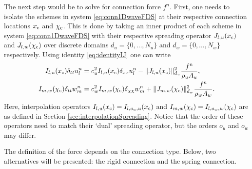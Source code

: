 The next step would be to solve for connection force $f^n$. First, one needs to isolate the schemes in system \eqref{eq:conn1DwaveFDS} at their respective connection locations $x_{\text{c}}$ and $\chi_{\text{c}}$. This is done by taking an inner product of each scheme in system \eqref{eq:conn1DwaveFDS} with their respective spreading operator $J_{l, u}(x_{\text{c}})$ and $J_{l, w}(\chi_{\text{c}})$ over discrete domains $d_u = \{0, \hdots, N_u\}$ and $d_w = \{0, \hdots, N_w\}$ respectively. Using identity \eqref{eq:identityIJ} one can write
\begin{subequations}\label{eq:conn1DwaveFDSXc}
    \begin{align}
        I_{l, u}(x_{\text{c}})\delta_{tt} u_l^n &= c_u^2 I_{l, u}(x_{\text{c}})\delta_{xx} u_l^n -\lVert J_{l, u}(x_{\text{c}})\rVert_{d_u}^2\frac{f^n}{\rho_u A_u}, \label{eq:conn1DwaveuXc} \\
        I_{m, w}(\chi_{\text{c}})\delta_{tt} w_m^n &= c_w^2 I_{m, w}(\chi_{\text{c}})\delta_{\chi\chi} w_m^n + \lVert J_{m, w}(\chi_{\text{c}})\rVert_{d_w}^2\frac{f^n}{\rho_w A_w}.\label{eq:conn1DwavewXc}
    \end{align}
\end{subequations}
Here, interpolation operators $I_{l, u}(x_{\text{c}}) = I_{l, o_u, u}(x_{\text{c}})$ and $I_{m, w}(\chi_{\text{c}}) = I_{l, o_w, w}(\chi_{\text{c}})$ are as defined in Section \ref{sec:interpolationSpreading}. Notice that the order of these operators need 
to match their `dual' spreading operator, but the orders $o_u$ and $o_w$ may differ.

The definition of the force depends on the connection type. Below, two alternatives will be presented: the rigid connection and the spring connection. 


